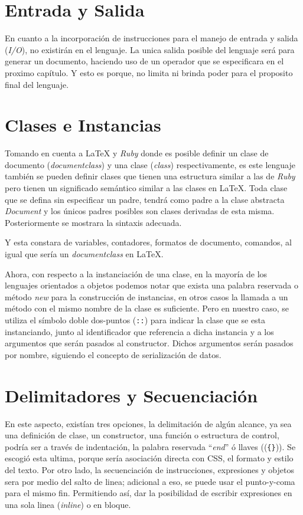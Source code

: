 \documentclass[12pt,letterpaper,titlepage,oneside,openright]{book}
\newcommand{\latex}{\LaTeX\xspace}
\newcommand{\ruby}{\textit{Ruby}\xspace}
\newcommand{\ttcode}[1]{(\texttt{#1})}
\begin{document}
\section{Entrada y Salida}

En cuanto a la incorporación de instrucciones para el manejo de entrada y salida
(\textit{I/O}), no existirán en el lenguaje. La unica salida posible del
lenguaje será para generar un documento, haciendo uso de un operador que se
especificara en el proximo capítulo. Y esto es porque, no limita ni brinda poder
para el proposito final del lenguaje.

\section{Clases e Instancias}

Tomando en cuenta a \latex y \ruby donde es posible definir un clase de documento
(\textit{documentclass}) y una clase (\textit{class}) respectivamente, es este
lenguaje también se pueden definir clases que tienen una estructura similar a
las de \ruby pero tienen un significado semántico similar a las clases en \latex.
Toda clase que se defina sin especificar un padre, tendrá como padre a la clase
abstracta \textit{Document} y los únicos padres posibles son clases derivadas de
esta misma. Posteriormente se mostrara la sintaxis adecuada.

Y esta constara de variables, contadores, formatos de documento, comandos, al
igual que sería un \textit{documentclass} en \latex.

Ahora, con respecto a la instanciación de una clase, en la mayoría de los
lenguajes orientados a objetos podemos notar que exista una palabra reservada o
método \textit{new} para la construcción de instancias, en otros casos la
llamada a un método con el mismo nombre de la clase es suficiente. Pero en
nuestro caso, se utiliza el símbolo doble dos-puntos (\texttt{::}) para
indicar la clase que se esta instanciando, junto al identificador que referencia
a dicha instancia y a los argumentos que serán pasados al constructor. Dichos
argumentos serán pasados por nombre, siguiendo el concepto de serialización de
datos.

\section{Delimitadores y Secuenciación}

En este aspecto, existían tres opciones, la delimitación de algún alcance, ya
sea una definición de clase, un constructor, una función o estructura de control,
podría ser a través de indentación, la palabra reservada ``\textit{end}'' ó llaves
(\ttcode{\{\}}). Se escogió esta ultima, porque sería asociación directa con CSS,
el formato y estilo del texto. Por otro lado, la secuenciación de instrucciones,
expresiones y objetos sera por medio del salto de linea; adicional a eso, se puede
usar el punto-y-coma para el mismo fin. Permitiendo así, dar la posibilidad de
escribir expresiones en una sola linea (\textit{inline}) o en bloque.
\end{document}
